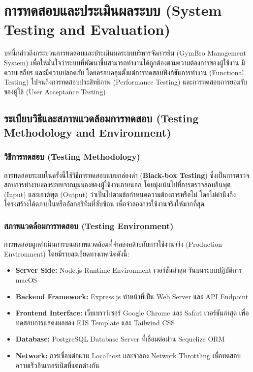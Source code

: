 \chapter{การทดสอบและประเมินผลระบบ (System Testing and Evaluation)}

บทนี้กล่าวถึงกระบวนการทดสอบและประเมินผลระบบบริหารจัดการยิม (GymBro Management System) เพื่อให้มั่นใจว่าระบบที่พัฒนาขึ้นสามารถทำงานได้ถูกต้องตามความต้องการของผู้ใช้งาน มีความเสถียร และมีความปลอดภัย โดยครอบคลุมตั้งแต่การทดสอบฟังก์ชันการทำงาน (Functional Testing) ไปจนถึงการทดสอบประสิทธิภาพ (Performance Testing) และการทดสอบการยอมรับของผู้ใช้ (User Acceptance Testing)

\section{ระเบียบวิธีและสภาพแวดล้อมการทดสอบ (Testing Methodology and Environment)}

\subsection{วิธีการทดสอบ (Testing Methodology)}
การทดสอบระบบในครั้งนี้ใช้วิธีการทดสอบแบบกล่องดำ (\textbf{Black-box Testing}) ซึ่งเป็นการตรวจสอบการทำงานของระบบจากมุมมองของผู้ใช้งานภายนอก โดยมุ่งเน้นไปที่การตรวจสอบอินพุต (Input) และเอาต์พุต (Output) ว่าเป็นไปตามข้อกำหนดความต้องการหรือไม่ โดยไม่คำนึงถึงโครงสร้างโค้ดภายในหรืออัลกอริทึมที่ซับซ้อน เพื่อจำลองการใช้งานจริงให้มากที่สุด

\subsection{สภาพแวดล้อมการทดสอบ (Testing Environment)}
การทดสอบถูกดำเนินการบนสภาพแวดล้อมที่จำลองคล้ายกับการใช้งานจริง (Production Environment) โดยมีรายละเอียดทางเทคนิคดังนี้:
\begin{itemize}
    \item \textbf{Server Side:} Node.js Runtime Environment เวอร์ชันล่าสุด รันบนระบบปฏิบัติการ macOS
    \item \textbf{Backend Framework:} Express.js ทำหน้าที่เป็น Web Server และ API Endpoint
    \item \textbf{Frontend Interface:} เว็บเบราว์เซอร์ Google Chrome และ Safari เวอร์ชันล่าสุด เพื่อทดสอบการแสดงผลของ EJS Template และ Tailwind CSS
    \item \textbf{Database:} PostgreSQL Database Server ที่เชื่อมต่อผ่าน Sequelize ORM
    \item \textbf{Network:} การเชื่อมต่อผ่าน Localhost และจำลอง Network Throttling เพื่อทดสอบความเร็วอินเทอร์เน็ตที่แตกต่างกัน
\end{itemize}

